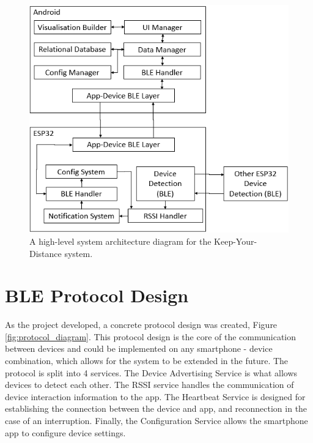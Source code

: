 \documentclass{l4proj}
\begin{document}
\begin{figure}[!htb]
    \centering
    \includegraphics[width=0.5\linewidth]{images/high-level_system_architecture.png}

    \caption{ A high-level system architecture diagram for the Keep-Your-Distance system. }

    \label{fig:arch_diagram}
\end{figure}

\section{BLE Protocol Design}

As the project developed, a concrete protocol design was created, Figure \ref{fig:protocol_diagram}. This protocol design is the core of the communication between devices and could be implemented on any smartphone - device combination, which allows for the system to be extended in the future. The protocol is split into 4 services. The Device Advertising Service is what allows devices to detect each other. The RSSI service handles the communication of device interaction information to the app. The Heartbeat Service is designed for establishing the connection between the device and app, and reconnection in the case of an interruption. Finally, the Configuration Service allows the smartphone app to configure device settings.
\end{document}

